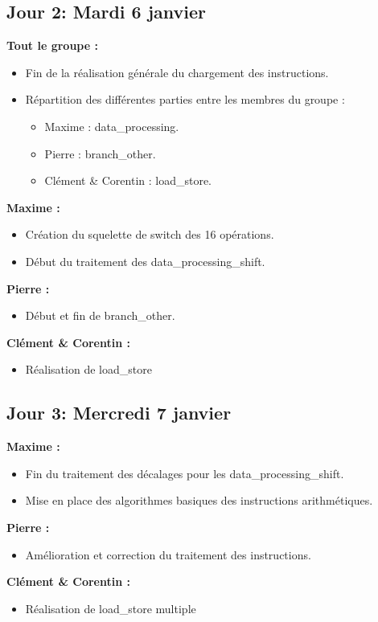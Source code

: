 \documentclass[11pt]{article} %
\begin{document}
\subsection{Jour 2: Mardi 6 janvier}
\textbf{Tout le groupe :}
\begin{itemize}
  \item Fin de la r\'ealisation g\'en\'erale du chargement des instructions.
  \item R\'epartition des diff\'erentes parties entre les membres du groupe :
  \begin{itemize}
    \item Maxime : data\_processing.
    \item Pierre : branch\_other.
    \item Cl\'ement \& Corentin : load\_store.
  \end{itemize}
\end{itemize}
\textbf{Maxime :}
\begin{itemize}
  \item Cr\'eation du squelette de switch des 16 op\'erations.
  \item D\'ebut du traitement des data\_processing\_shift.
\end{itemize}
\textbf{Pierre :}
\begin{itemize}
  \item D\'ebut et fin de branch\_other.
\end{itemize}
\textbf{Cl\'ement \& Corentin :}
\begin{itemize}
  \item R\'ealisation de load\_store
\end{itemize}

\subsection{Jour 3: Mercredi 7 janvier}
\textbf{Maxime :}
\begin{itemize}
  \item Fin du traitement des d\'ecalages pour les data\_processing\_shift.
  \item Mise en place des algorithmes basiques des instructions arithm\'etiques.
\end{itemize}
\textbf{Pierre :}
\begin{itemize}
  \item Am\'elioration et correction du traitement des instructions.
\end{itemize}
\textbf{Cl\'ement \& Corentin :}
\begin{itemize}
  \item R\'ealisation de load\_store multiple
\end{itemize}
\end{document}
